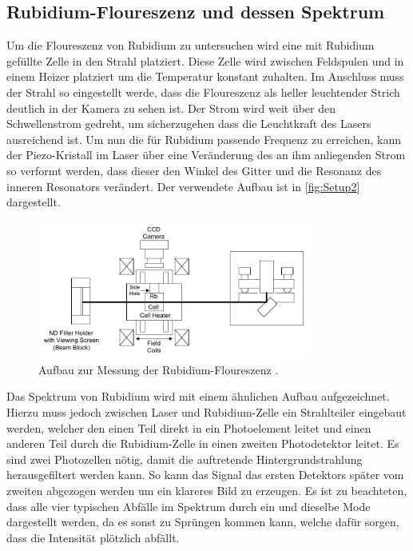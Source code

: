 \subsection{Rubidium-Floureszenz und dessen Spektrum}
\label{sec:Rubi}
Um die Floureszenz von Rubidium zu untersuchen wird eine mit Rubidium gefüllte Zelle in den Strahl platziert. Diese Zelle wird zwischen Feldspulen und in einem Heizer platziert um die Temperatur konstant zuhalten.
Im Anschluss muss der Strahl so eingestellt werde, dass die Floureszenz als heller leuchtender Strich deutlich in der Kamera zu sehen ist. Der Strom wird weit über den Schwellenstrom gedreht, um sicherzugehen dass die Leuchtkraft des Lasers
ausreichend ist. Um nun die für Rubidium passende Frequenz zu erreichen, kann der Piezo-Kristall im Laser über eine Veränderung des an ihm anliegenden Strom so verformt werden, dass dieser 
den Winkel des Gitter und die Resonanz des inneren Resonators verändert.
Der verwendete Aufbau ist in \autoref{fig:Setup2} dargestellt.
\begin{figure}
    \centering
        \includegraphics[width=0.8\textwidth]{Setup2.pdf}
        \caption{Aufbau zur Messung der Rubidium-Floureszenz \cite{ap60}.}
        \label{fig:Setup2} 
\end{figure}
Das Spektrum von Rubidium wird mit einem ähnlichen Aufbau aufgezeichnet. Hierzu muss jedoch zwischen Laser und Rubidium-Zelle ein Strahlteiler eingebaut werden, welcher den einen Teil direkt in ein Photoelement leitet
und einen anderen Teil durch die Rubidium-Zelle in einen zweiten Photodetektor leitet.
Es sind zwei Photozellen nötig, damit die auftretende Hintergrundstrahlung herausgefiltert werden kann. So kann das Signal das ersten Detektors später vom zweiten abgezogen werden um ein klareres Bild zu erzeugen.
Es ist zu beachteten, dass alle vier typischen Abfälle im Spektrum durch ein und dieselbe Mode dargestellt werden, da es sonst zu Sprüngen kommen kann, welche dafür sorgen, dass die Intensität plötzlich abfällt.